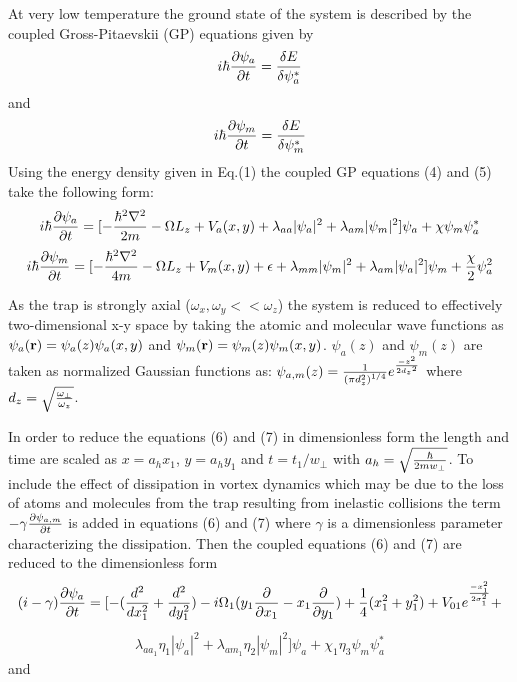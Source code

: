 \documentclass[10pt,a4paper]{article}
\begin{document}
At very low temperature the ground state of the system is
described by the coupled Gross-Pitaevskii (GP) equations given by
\begin{eqnarray}i\hbar{\partial\psi_a\over \partial t}={\delta E\over \delta \psi_a^*}\end{eqnarray}
and
\begin{eqnarray}i\hbar{\partial\psi_m\over \partial t}={\delta E\over \delta \psi_m^*}\end{eqnarray}
Using the energy density given in Eq.(1) the coupled GP equations
(4) and (5) take the following form:
\begin{eqnarray}i\hbar{\partial\psi_a\over
\partial t}=[-{\hbar^2\nabla^2\over 2m}-\Omega
L_z+V_a({x,y})+{\lambda_{aa}}|\psi_a|^2+\lambda_{am}|\psi_m|^2]\psi_a
+\chi\psi_m\psi_a^*\end{eqnarray}
\begin{eqnarray}i\hbar{\partial\psi_m\over
\partial t}=[-{\hbar^2\nabla^2\over 4m}-\Omega
L_z+V_m({x,y})+\epsilon+{\lambda_{mm}}|\psi_m|^2+\lambda_{am}|\psi_a|^2]\psi_m
+{\chi\over 2}\psi_a^2\end{eqnarray}

As the trap is strongly axial ($\omega_x,\omega_y<<\omega_z$) the
system is reduced to effectively two-dimensional x-y space by
taking the atomic and molecular wave functions as $\psi_a({\bf
r})=\psi_a(z)\psi_a(x,y)$ and $\psi_m({\bf
r})=\psi_m(z)\psi_m(x,y)$. $\psi_a(z)$ and $\psi_m(z)$ are taken
as normalized Gaussian functions as: $\psi_{a,m}(z)={1\over {(\pi
d_z^2)}^{1/4}}e^{{-z^2\over 2 {d_z}^2}}$ where
$d_z=\sqrt{{\omega_\perp\over \omega_z}}$.


In order to reduce the equations (6) and (7) in dimensionless form
the length and time are scaled as $x=a_hx_1$, $y=a_hy_1$ and
$t=t_1/w_\perp$ with $a_h=\sqrt{{\hbar\over 2mw_\perp}}$. To
include the effect of dissipation in vortex dynamics which may be
due to the loss of atoms and molecules from the trap resulting
from inelastic collisions the term
$-\gamma{\partial\psi_{a,m}\over \partial t}$ is added in
equations (6) and (7) where $\gamma$ is a dimensionless parameter
characterizing the dissipation. Then the coupled equations (6) and
(7) are reduced to the dimensionless form
$$(i-\gamma){\partial\psi_a\over
\partial t}=[-({d^2\over dx_1^2}+{d^2\over dy_1^2})-i\Omega_1(y_1{\partial\over \partial x_1}-x_1{\partial \over \partial y_1})
+{1\over 4}(x_1^2+y_1^2)+V_{01}e^{-x_1^2\over 2
\sigma_1^2}+$$
\begin{eqnarray}{\lambda_{aa_1}}\eta_1|\psi_a|^2+\lambda_{am_1}\eta_2|\psi_m|^2]\psi_a
+\chi_1\eta_3\psi_m\psi_a^*\end{eqnarray} and
\end{document}
